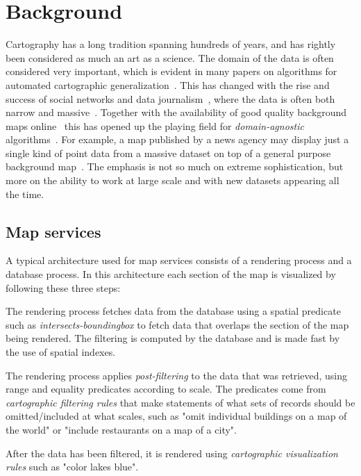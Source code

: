 \section{Background}
\label{sec:background}

Cartography has a long tradition spanning hundreds of years, and has rightly been considered as much an art as a science. The domain of the data is often considered very important, which is evident in many papers on algorithms for automated cartographic generalization~\cite{areaagg,ordnance,another}. This has changed with the rise and success of social networks and data journalism~\cite{datajournalism}, where the data is often both narrow and massive~\cite{twitter,datablog}. Together with the availability of good quality background maps online~\cite{bing,google,osm} this has opened up the playing field for \emph{domain-agnostic} algorithms~\cite{fusiontables,samet}. For example, a map published by a news agency may display just a single kind of point data from a massive dataset on top of a general purpose background map~\cite{iraq}. The emphasis is not so much on extreme sophistication, but more on the ability to work at large scale and with new datasets appearing all the time.

\subsection{Map services}

A typical architecture used for map services consists of a rendering process and a database process. In this architecture each section of the map is visualized by following these three steps:

 The rendering process fetches data from the database using a spatial predicate such as \emph{intersects-boundingbox} to fetch data that overlaps the section of the map being rendered. The filtering is computed by the database and is made fast by the use of spatial indexes.

 The rendering process applies \emph{post-filtering} to the data that was retrieved, using range and equality predicates according to scale. The predicates come from \emph{cartographic filtering rules} that make statements of what sets of records should be omitted/included at what scales, such as "omit individual buildings on a map of the world" or "include restaurants on a map of a city".

 After the data has been filtered, it is rendered using \emph{cartographic visualization rules} such as "color lakes blue".


